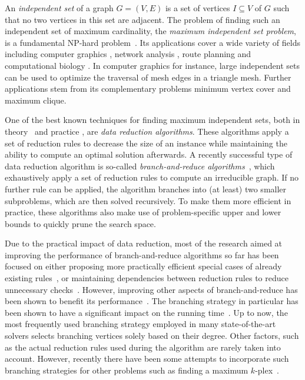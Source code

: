\documentclass[a4paper,UKenglish,cleveref, autoref, thm-restate]{lipics-v2021}
\begin{document}
An \emph{independent set} of a graph $G = (V,E)$ is a set of vertices $I \subseteq V$ of $G$ such that no two vertices in this set are adjacent.
The problem of finding such an independent set of maximum cardinality, the \emph{maximum independent set problem}, is a fundamental NP-hard problem~\cite{Garey1974}.
Its applications cover a wide variety of fields including computer graphics \cite{CG}, network analysis \cite{NW}, route planning \cite{RP} and computational biology \cite{BIO1, BIO2}.
In computer graphics for instance, large independent sets can be used to optimize the traversal of mesh edges in a triangle mesh.
Further applications stem from its complementary problems minimum vertex cover and maximum clique.

One of the best known techniques for finding maximum independent sets, both in
theory~\cite{XiaoNagamochi, ChenXiaKanj} and practice \cite{AkibaIwata}, are
\emph{data reduction algorithms}.
These algorithms apply a set of reduction rules to decrease the size of an instance while maintaining the ability to compute an optimal solution afterwards.
A recently successful type of data reduction algorithm is so-called
\emph{branch-and-reduce algorithms}~\cite{AkibaIwata,WGYC}, which exhaustively
apply a set of reduction rules to compute an irreducible graph.
If no further rule can be applied, the algorithm branches into (at least) two
smaller subproblems, which are then solved recursively.
To make them more efficient in practice, these algorithms also make use of problem-specific upper and lower bounds to quickly prune the search space.

Due to the practical impact of data reduction, most of the research aimed at
improving the performance of branch-and-reduce algorithms so far has been
focused on either proposing more practically efficient special cases of already
existing rules~\cite{ChangKern,dahlum2016accelerating}, or maintaining
dependencies between reduction rules to reduce unnecessary
checks~\cite{alsahafy2020computing,hespe2019scalable}.
However, improving other aspects of branch-and-reduce has been shown to benefit its performance~\cite{plachetta2021sat}.
The branching strategy in particular has been shown to have a significant impact on the running time~\cite{AkibaIwata}.
Up to now, the most frequently used branching strategy employed in many state-of-the-art solvers selects branching vertices solely based on their degree.
Other factors, such as the actual reduction rules used during the algorithm are rarely taken into account.
However, recently there have been some attempts to incorporate such branching
strategies for other problems such as finding a maximum $k$-plex~\cite{gao2018exact}.
\end{document}
